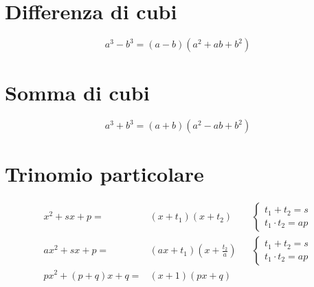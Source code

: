 \section{Differenza di cubi}
\begin{equation*}
a^3-b^3=(a-b)(a^2+ab+b^2)
\end{equation*}
\section{Somma di cubi}
\begin{equation*}
a^3+b^3=(a+b)(a^2-ab+b^2)
\end{equation*}
\section{Trinomio particolare}
\begin{align*}
x^2+sx+p=&(x+t_1)(x+t_2)&&\begin{cases}
t_1+t_2=s\\
t_1\cdot t_2=ap
\end{cases}\\
ax^2+sx+p=&(ax+t_1)(x+\frac{t_2}{a})&&\begin{cases}
t_1+t_2=s\\
t_1\cdot t_2=ap
\end{cases}\\
px^2+(p+q)x+q=&(x+1)(px+q)\\
\end{align*}

